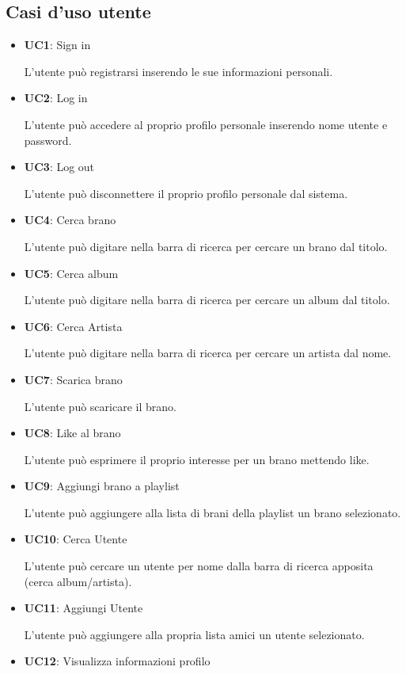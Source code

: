 \subsection{Casi d'uso utente}
\begin{itemize}
      \item \textbf{UC1}: Sign in 
            
      L'utente può registrarsi inserendo le sue informazioni
            personali.
      \item \textbf{UC2}: Log in 
      
      L'utente può accedere al proprio profilo personale
            inserendo nome utente e password.
      \item \textbf{UC3}: Log out 
      
      L'utente può disconnettere il proprio profilo personale
            dal sistema.
     
      \item \textbf{UC4}: Cerca brano 
      
      L'utente può digitare nella barra di ricerca per cercare un brano dal titolo.
      \item \textbf{UC5}: Cerca album
      
      L'utente può digitare nella barra di ricerca per cercare un album dal titolo.
      \item \textbf{UC6}: Cerca Artista
      
      L'utente può digitare nella barra di ricerca per cercare un artista dal nome.
      
      
      \item \textbf{UC7}: Scarica brano 
      
      L'utente può scaricare il brano.
      \item \textbf{UC8}: Like al brano 
      
      L'utente può esprimere il proprio interesse per un brano mettendo like.
      \item \textbf{UC9}: Aggiungi brano a playlist
      
      L'utente può aggiungere alla lista di brani della playlist un brano selezionato.
      \item \textbf{UC10}: Cerca Utente 
      
      L'utente può cercare un utente per nome dalla barra
            di ricerca apposita (cerca album/artista).
      \item \textbf{UC11}: Aggiungi Utente 
      
      L'utente può aggiungere alla propria lista amici un utente selezionato.
      \item \textbf{UC12}: Visualizza informazioni profilo 
      

\end{itemize}
